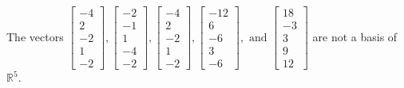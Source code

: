 \begin{exercise}
\begin{exerciseStatement}
  \end{exerciseStatement}
  \begin{exerciseAnswer}
   The vectors \(\left[\begin{array}{r}
-4 \\
2 \\
-2 \\
1 \\
-2
\end{array}\right] , \left[\begin{array}{r}
-2 \\
-1 \\
1 \\
-4 \\
-2
\end{array}\right] , \left[\begin{array}{r}
-4 \\
2 \\
-2 \\
1 \\
-2
\end{array}\right] , \left[\begin{array}{r}
-12 \\
6 \\
-6 \\
3 \\
-6
\end{array}\right] , \text{ and } \left[\begin{array}{r}
18 \\
-3 \\
3 \\
9 \\
12
\end{array}\right]\) 
  	 are not  a basis of \(\mathbb{R}^5\).
  


  \end{exerciseAnswer}
\end{exercise}